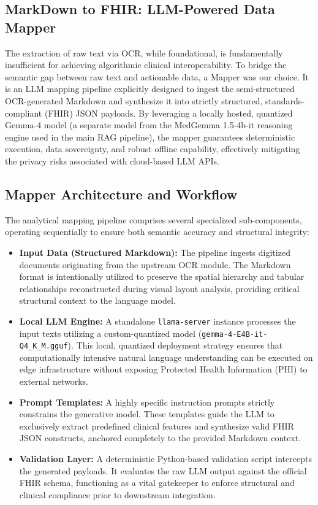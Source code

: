 \subsection{MarkDown to FHIR: LLM-Powered Data Mapper}
\label{sec:data_mapper}

The extraction of raw text via OCR, while foundational, is fundamentally insufficient for achieving algorithmic clinical interoperability. To bridge the semantic gap between raw text and actionable data, a Mapper was our choice. It is an LLM mapping pipeline explicitly designed to ingest the semi-structured OCR-generated Markdown and synthesize it into strictly structured, standards-compliant (FHIR) JSON payloads. By leveraging a locally hosted, quantized Gemma-4 model (a separate model from the MedGemma 1.5-4b-it reasoning engine used in the main RAG pipeline), the mapper guarantees deterministic execution, data sovereignty, and robust offline capability, effectively mitigating the privacy risks associated with cloud-based LLM APIs.

\subsection{Mapper Architecture and Workflow}
\label{subsec:mapper_architecture}

The analytical mapping pipeline comprises several specialized sub-components, operating sequentially to ensure both semantic accuracy and structural integrity:

\begin{itemize}
    \item \textbf{Input Data (Structured Markdown):} The pipeline ingests digitized documents originating from the upstream OCR module. The Markdown format is intentionally utilized to preserve the spatial hierarchy and tabular relationships reconstructed during visual layout analysis, providing critical structural context to the language model.
    \item \textbf{Local LLM Engine:} A standalone \texttt{llama-server} instance processes the input texts utilizing a custom-quantized model (\texttt{gemma-4-E4B-it-Q4\_K\_M.gguf}). This local, quantized deployment strategy ensures that computationally intensive natural language understanding can be executed on edge infrastructure without exposing Protected Health Information (PHI) to external networks.
    \item \textbf{Prompt Templates:} A highly specific instruction prompts strictly constrains the generative model. These templates guide the LLM to exclusively extract predefined clinical features and synthesize valid FHIR JSON constructs, anchored completely to the provided Markdown context.
    \item \textbf{Validation Layer:} A deterministic Python-based validation script intercepts the generated payloads. It evaluates the raw LLM output against the official FHIR schema, functioning as a vital gatekeeper to enforce structural and clinical compliance prior to downstream integration.
\end{itemize}

